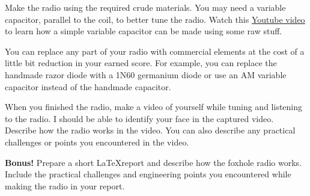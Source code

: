 \documentclass[11pt]{article}
\begin{document}
\begin{question}
\begin{subquestion}{Make the radio using the required crude materials. You may need a variable capacitor, parallel to the coil, to better tune the radio. Watch this \underline{{\color{blue}\href{https://www.youtube.com/watch?v=VqdcU9ULAlA}{Youtube video}}} to learn how a simple variable capacitor can be made using some raw stuff.} 
\end{subquestion}

\begin{subquestion}{You can replace any part of your radio with commercial elements at the cost of a little bit reduction in your earned score. For example, you can replace the handmade razor diode with a 1N60 germanium diode or use an AM variable capacitor instead of the handmade capacitor. 
} 
\end{subquestion}

\begin{subquestion}{When you finished the radio, make a video of yourself while tuning and listening to the radio. I should be able to identify your face in the captured video. Describe how the radio works in the video. You can also describe any practical challenges or points you encountered in the video. 
} 
\end{subquestion}

\begin{subquestion}{\textbf{Bonus!} Prepare a short \LaTeX report and describe how the foxhole radio works. Include the practical challenges and engineering points you encountered while making the radio in your report.
} 
\end{subquestion}

\end{question}



\end{document}
